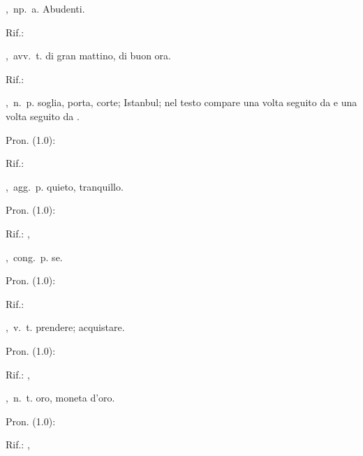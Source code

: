 ,\ np.\ a.
Abudenti.
\begin{subvocedue}
\item[Rif.:] 
\end{subvocedue}
,\ avv.\ t.
di gran mattino, di buon ora.
\begin{subvocedue}
\item[Rif.:] 
\end{subvocedue}
,\ n.\ p.
soglia,   porta, corte; Istanbul; nel testo compare una  volta   seguito  da     e  una  volta   seguito  da .
\begin{subvocedue}
\item[Pron. (1.0):] 
\item[Rif.:] 
\end{subvocedue}
,\ agg.\ p.
quieto, tranquillo.
\begin{subvocedue}
\item[Pron. (1.0):] 
\item[Rif.:] , 
\end{subvocedue}
,\ cong.\ p.
se.
\begin{subvocedue}
\item[Pron. (1.0):] 
\item[Rif.:] 
\end{subvocedue}
,\ v.\ t.
prendere; acquistare.
\begin{subvocedue}
\item[Pron. (1.0):] 
\item[Rif.:] , 
\end{subvocedue}
,\ n.\ t.
oro, moneta d'oro.
\begin{subvocedue}
\item[Pron. (1.0):] 
\item[Rif.:] , 
\end{subvocedue}
